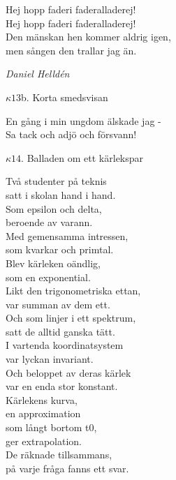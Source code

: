 \documentclass[a6paper,10pt]{article}
\begin{document}
\newpage
\setlength{\oddsidemargin}{-0.37in}
\noindent
Hej hopp faderi faderalladerej!\\
Hej hopp faderi faderalladerej!\\
Den mänskan hen kommer aldrig igen,\\
men sången den trallar jag än. 
\begin{flushright}
\textit{Daniel Helldén}
\end{flushright}
\begin{center}
\Large $\kappa13$b. Korta smedsvisan \\
\end{center}
En gång i min ungdom älskade jag - \\
Sa tack och adjö och försvann!
\vspace{20pt}
\begin{center}
\Large $\kappa14$. Balladen om ett kärlekspar \\
\end{center}
Två studenter på teknis \\
satt i skolan hand i hand. \\
Som epsilon och delta, \\
beroende av varann. \\
Med gemensamma intressen, \\
som kvarkar och primtal. \\
Blev kärleken oändlig, \\
som en exponential. 
\vspace{5pt}\\
Likt den trigonometriska ettan, \\
var summan av dem ett. \\
Och som linjer i ett spektrum, \\
satt de alltid ganska tätt. \\
I vartenda koordinatsystem \\
var lyckan invariant. \\
Och beloppet av deras kärlek \\
var en enda stor konstant. \\
\setlength{\oddsidemargin}{-0.47in}
\noindent
Kärlekens kurva, \\
en approximation \\
som långt bortom t0, \\
ger extrapolation. \\
De räknade tillsammans, \\
på varje fråga fanns ett svar. \\
\end{document}
